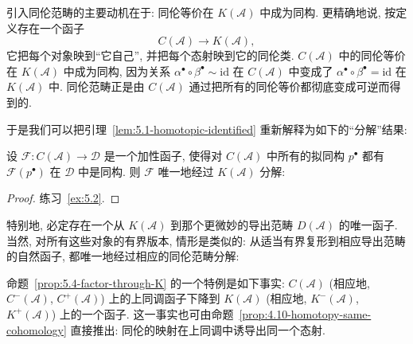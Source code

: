 \indent 引入同伦范畴的主要动机在于: 同伦等价在 $K(\mathcal{A})$ 中成为同构. 更精确地说, 按定义存在一个函子
\[
C(\mathcal{A})\longrightarrow K(\mathcal{A}),
\]
它把每个对象映到``它自己'', 并把每个态射映到它的同伦类. $C(\mathcal{A})$ 中的同伦等价在 $K(\mathcal{A})$ 中成为同构, 因为关系 $\alpha^\bullet\circ\beta^\bullet\sim\mathrm{id}$ 在 $C(\mathcal{A})$ 中变成了 $\alpha^\bullet\circ\beta^\bullet=\mathrm{id}$ 在 $K(\mathcal{A})$ 中. 同伦范畴正是由 $C(\mathcal{A})$ 通过把所有的同伦等价都彻底变成可逆而得到的.

\indent 于是我们可以把引理~\ref{lem:5.1-homotopic-identified} 重新解释为如下的``分解''结果:

\begin{proposition}\label{prop:5.4-factor-through-K}
设 $\mathcal{F}:C(\mathcal{A})\to\mathcal{D}$ 是一个加性函子, 使得对 $C(\mathcal{A})$ 中所有的拟同构 $p^\bullet$ 都有 $\mathcal{F}(p^\bullet)$ 在 $\mathcal{D}$ 中是同构. 则 $\mathcal{F}$ 唯一地经过 $K(\mathcal{A})$ 分解:
\begin{center}
\end{center}
\end{proposition}

\begin{proof}
练习~\ref{ex:5.2}.
\end{proof}

\indent 特别地, 必定存在一个从 $K(\mathcal{A})$ 到那个更微妙的导出范畴 $D(\mathcal{A})$ 的唯一函子. 当然, 对所有这些对象的有界版本, 情形是类似的: 从适当有界复形到相应导出范畴的自然函子, 都唯一地经过相应的同伦范畴分解:
\begin{center}
\end{center}

\indent 命题~\ref{prop:5.4-factor-through-K} 的一个特例是如下事实: $C(\mathcal{A})$ (相应地, $C^-(\mathcal{A})$, $C^+(\mathcal{A})$) 上的上同调函子下降到 $K(\mathcal{A})$ (相应地, $K^-(\mathcal{A})$, $K^+(\mathcal{A})$) 上的一个函子. 这一事实也可由命题~\ref{prop:4.10-homotopy-same-cohomology} 直接推出: 同伦的映射在上同调中诱导出同一个态射.

